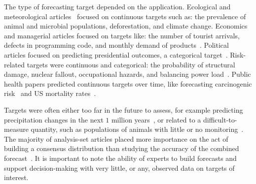 \documentclass[preprint,authoryear,nonatbib]{elsarticle}
\begin{document}
The type of forecasting target depended on the application.
Ecological and meteorological articles~\parencite{johnson2018making,cooke2014out,li2012preliminary,tartakovsky2007probabilistic,morales2017characterization,borsuk2004predictive,abramson1996hailfinder,mantyka2014understanding,kurowicka2010probabilistic,wang2018bayesian} focused on continuous targets such as: the prevalence of animal and microbial populations, deforestation, and climate change.
Economics and managerial articles focused on targets like: the number of tourist arrivals, defects in programming code, and monthly demand of products~\parencite{song2013combining,kabak2008aggregating,huang2016improving,failing2004using,shin2013robust}.
Political articles focused on predicting presidential outcomes, a categorical target~\parencite{hurley2002combining,graefe2014accuracy,morgan2014use,graefe2015accuracy,graefe2018predicting,graefe2014combining}.
Risk-related targets were continuous and categorical: the probability of structural damage, nuclear fallout, occupational hazards, and balancing power load~\parencite{klas2010support,zio1997accounting,cabello2012combination,adams2009acceptability,neves2008life,jana2019interval,hathout2016uncertainty,wang2008probabilistic,ren2002optimal,zio1996use,baecke2017investigating,brito2016bayesian,craig2001bayesian,mu1999multi,brito2012behavioral}.
Public health papers predicted continuous targets over time, like forecasting carcinogenic risk~\parencite{evans1994use} and US mortality rates~\parencite{alho1992estimating}.

Targets were often either too far in the future to assess, for example predicting precipitation changes in the next $1$ million years~\parencite{zio1997accounting}, or related to a difficult-to-measure quantity, such as populations of animals with little or no monitoring~\parencite{johnson2018making,borsuk2004predictive,mantyka2014understanding}.
The majority of analysis-set articles placed more importance on the act of building a consensus distribution than studying the accuracy of the combined forecast~\parencite{johnson2018making,cooke2014out,li2012preliminary,klas2010support,zio1997accounting,song2013combining,clemen2007advances,tartakovsky2007probabilistic,morgan2014use,borsuk2004predictive,kabak2008aggregating,cabello2012combination,adams2009acceptability,neves2008life,failing2004using,evans1994use,hora2015calibration,abramson1996hailfinder,hathout2016uncertainty,wang2008probabilistic,mantyka2014understanding,kurowicka2010probabilistic,zio1996use,brito2016bayesian,gu2016expert,mu1999multi,wang2018bayesian,shin2013robust,brito2012behavioral,baron2014two}.
It is important to note the ability of experts to build forecasts and support decision-making with very little, or any, observed data on targets of interest.
\end{document}
